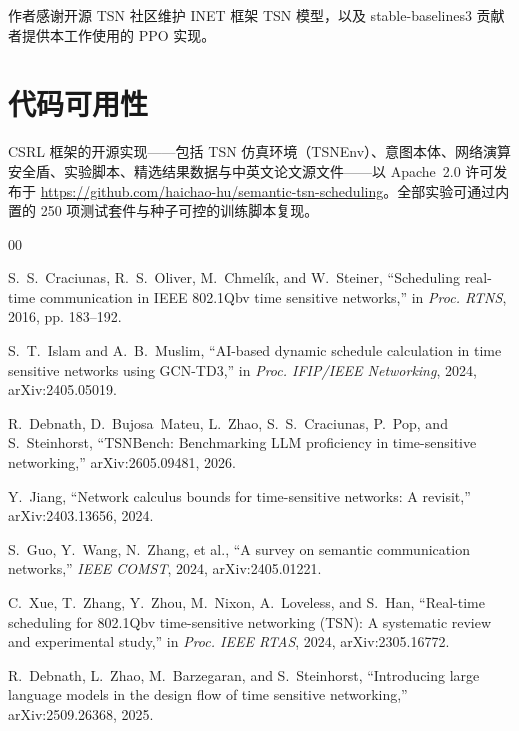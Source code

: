 \documentclass[UTF8]{ctexart}
\begin{document}
作者感谢开源 TSN 社区维护 INET 框架 TSN 模型，以及 stable-baselines3 贡献者提供本工作使用的 PPO 实现。

\section*{代码可用性}

CSRL 框架的开源实现——包括 TSN 仿真环境（TSNEnv）、意图本体、网络演算安全盾、实验脚本、精选结果数据与中英文论文源文件——以 Apache~2.0 许可发布于 \url{https://github.com/haichao-hu/semantic-tsn-scheduling}。全部实验可通过内置的 250 项测试套件与种子可控的训练脚本复现。

\begin{thebibliography}{00}

S.~S.~Craciunas, R.~S.~Oliver, M.~Chmel\'{i}k, and W.~Steiner,
``Scheduling real-time communication in IEEE 802.1Qbv time sensitive networks,''
in \textit{Proc. RTNS}, 2016, pp. 183--192.

S.~T.~Islam and A.~B.~Muslim,
``AI-based dynamic schedule calculation in time sensitive networks using GCN-TD3,''
in \textit{Proc. IFIP/IEEE Networking}, 2024, arXiv:2405.05019.

R.~Debnath, D.~Bujosa~Mateu, L.~Zhao, S.~S.~Craciunas, P.~Pop, and S.~Steinhorst,
``TSNBench: Benchmarking LLM proficiency in time-sensitive networking,''
arXiv:2605.09481, 2026.

Y.~Jiang,
``Network calculus bounds for time-sensitive networks: A revisit,''
arXiv:2403.13656, 2024.

S.~Guo, Y.~Wang, N.~Zhang, et al.,
``A survey on semantic communication networks,''
\textit{IEEE COMST}, 2024, arXiv:2405.01221.

C.~Xue, T.~Zhang, Y.~Zhou, M.~Nixon, A.~Loveless, and S.~Han,
``Real-time scheduling for 802.1Qbv time-sensitive networking (TSN): A systematic review and experimental study,''
in \textit{Proc. IEEE RTAS}, 2024, arXiv:2305.16772.

R.~Debnath, L.~Zhao, M.~Barzegaran, and S.~Steinhorst,
``Introducing large language models in the design flow of time sensitive networking,''
arXiv:2509.26368, 2025.


\end{thebibliography}
\end{document}
